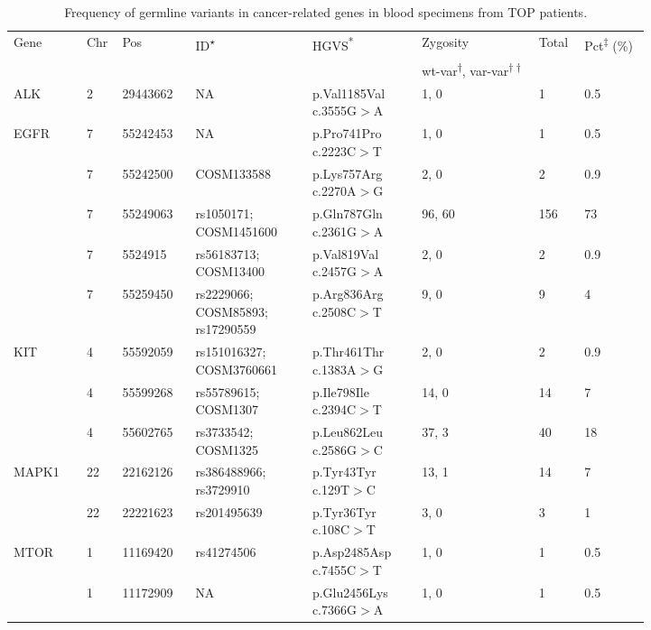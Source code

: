 
\newpage
\begin{longtable}{p{0.1\linewidth}|p{0.02\linewidth}p{0.1\linewidth}p{0.16\linewidth}p{0.15\linewidth}p{0.16\linewidth}p{0.04\linewidth}p{0.09\linewidth}}
\caption{Frequency of germline variants in cancer-related genes in blood specimens from TOP patients.}
\label{tbl:freq_cancer_genes}
    \\
    \hline
    Gene & Chr & Pos & ID\textsuperscript{$\star$} & HGVS\textsuperscript{*} & Zygosity & Total & Pct\textsuperscript{$\ddagger$} (\%)
		\\
		&
    \multicolumn{4}{l}{}
		&
		\multicolumn{1}{l}{wt-var\textsuperscript{$\dagger$}, var-var\textsuperscript{$\dagger\dagger$}}
		&
		\multicolumn{2}{l}{}
		\\
    \hline
		ALK & 2 & 29443662 & NA & p.Val1185Val c.3555G$>$A & 1, 0 & 1 & 0.5
		\\
		\hline
		EGFR & 7 & 55242453 & NA & p.Pro741Pro c.2223C$>$T & 1, 0 & 1 & 0.5
		\\
		& 7 & 55242500 & COSM133588 & p.Lys757Arg c.2270A$>$G & 2, 0 & 2 & 0.9
		\\
		& 7 & 55249063 & rs1050171; COSM1451600 & p.Gln787Gln c.2361G$>$A & 96, 60 & 156 & 73
		\\
		& 7 & 5524915 & rs56183713; COSM13400 & p.Val819Val c.2457G$>$A & 2, 0 & 2 & 0.9
		\\
		& 7 & 55259450 & rs2229066; COSM85893; rs17290559 & p.Arg836Arg c.2508C$>$T & 9, 0 & 9 & 4
		\\
    \hline
		KIT & 4 & 55592059 & rs151016327; COSM3760661 & p.Thr461Thr c.1383A$>$G & 2, 0 & 2 & 0.9
		\\
		& 4 & 55599268 & rs55789615; COSM1307 & p.Ile798Ile c.2394C$>$T & 14, 0 & 14 & 7
		\\
		& 4 & 55602765 & rs3733542; COSM1325 & p.Leu862Leu c.2586G$>$C & 37, 3 & 40 & 18
		\\
		\hline
		MAPK1 & 22 & 22162126 & rs386488966; rs3729910 & p.Tyr43Tyr c.129T$>$C & 13, 1 & 14 & 7
		\\
		& 22 & 22221623 & rs201495639 & p.Tyr36Tyr c.108C$>$T & 3, 0 & 3 & 1
		\\
		\hline
		MTOR & 1 & 11169420 & rs41274506 & p.Asp2485Asp c.7455C$>$T & 1, 0 & 1 & 0.5
		\\
		& 1 & 11172909 & NA & p.Glu2456Lys c.7366G$>$A & 1, 0 & 1 & 0.5
		\\

\end{longtable}
